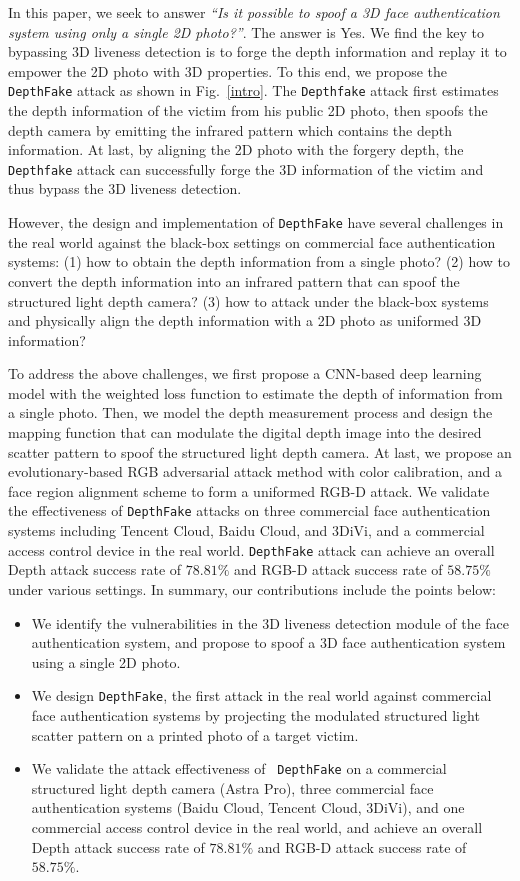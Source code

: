 In this paper, we seek to answer \emph{``Is it possible to spoof a 3D face authentication system using only a single 2D photo?''}.
The answer is Yes. We find the key to bypassing 3D liveness detection is to forge the depth information and replay it to empower the 2D photo with 3D properties. To this end, we propose the \texttt{DepthFake} attack as shown in Fig.~\ref{intro}. The \texttt{Depthfake} attack first estimates the depth information of the victim from his public 2D photo, then spoofs the depth camera by emitting the infrared pattern which contains the depth information. At last, by aligning the 2D photo with the forgery depth, the \texttt{Depthfake} attack can successfully forge the 3D information of the victim and thus bypass the 3D liveness detection.


However, the design and implementation of \texttt{DepthFake} have several challenges in the real world  against the black-box settings on commercial face authentication systems:
(1) how to obtain the depth information from a single photo?
(2) how to convert the depth information into an infrared pattern that can spoof the structured light depth camera?
(3) how to attack under the black-box systems and physically align the depth information with a 2D photo as uniformed 3D information? 


To address the above challenges, we first propose a CNN-based deep learning model with the weighted loss function to estimate the depth of information from a single photo.
Then, we model the depth measurement process and design the mapping function that can modulate the digital depth image into the desired scatter pattern to spoof the structured light depth camera.
At last, we propose an evolutionary-based RGB adversarial attack method with color calibration, and a face region alignment scheme to form a uniformed RGB-D attack.
We validate the effectiveness of \texttt{DepthFake} attacks on three commercial face authentication systems including Tencent Cloud, Baidu Cloud, and 3DiVi, and a commercial access control device in the real world. \texttt{DepthFake} attack can achieve an overall Depth attack success rate of $78.81\%$ and RGB-D attack success rate of $58.75\%$ under various settings. In summary, our contributions include the points below:
\begin{itemize}	
	\item We identify the vulnerabilities in the 3D liveness detection module of the face authentication system, and propose to spoof a 3D  face authentication system using a single 2D photo.	
	\item We design \texttt{DepthFake},  the first attack in the real world against commercial face authentication systems by projecting the modulated structured light scatter pattern on a printed photo of a target victim.	
	\item We validate the attack effectiveness of  \texttt{DepthFake} on a commercial structured light depth camera (Astra Pro), three commercial face authentication systems (Baidu Cloud, Tencent Cloud, 3DiVi), and one commercial access control device in the real world, and achieve an overall Depth attack success rate of $78.81\%$ and RGB-D attack success rate of $58.75\%$.
\end{itemize}

